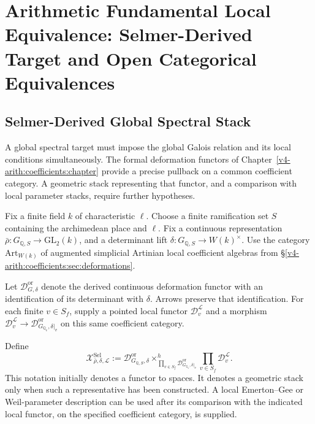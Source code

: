 \chapter{Arithmetic Fundamental Local Equivalence: Selmer-Derived Target and Open Categorical Equivalences}
\label{v4-arith:fle-completion-table}

\section{Selmer-Derived Global Spectral Stack}
\label{v4-arith:fle-table:spectral-target}

A global spectral target must impose the global Galois relation and
its local conditions simultaneously. The formal deformation functors of
Chapter~\ref{v4-arith:coefficients:chapter} provide a precise pullback
on a common coefficient category. A geometric stack representing that
functor, and a comparison with local parameter stacks, require further
hypotheses.

\begin{definition}
\label{v4-arith:fle-table:def:selmer-stack}
Fix a finite field \(k\) of characteristic \(\ell\). Choose a finite
ramification set \(S\) containing the archimedean place and \(\ell\).
Fix a continuous representation
\(\bar\rho:G_{\mathbb Q,S}\to\mathrm{GL}_2(k)\), and a determinant
lift \(\delta:G_{\mathbb Q,S}\to W(k)^\times\).
Use the category \(\mathrm{Art}_{W(k)}\) of augmented simplicial
Artinian local coefficient algebras from
\S\ref{v4-arith:coefficients:sec:deformations}.

Let \(\mathcal D_{G,\delta}^{\mathrm{or}}\) denote the derived
continuous deformation functor with an identification of its determinant
with \(\delta\). Arrows preserve that identification. For each finite
\(v\in S_f\), supply a pointed local functor
\(\mathcal D_v^{\mathcal L}\) and a morphism
\(\mathcal D_v^{\mathcal L}\to\mathcal D_{G_{\mathbb Q_v},\delta|_v}^{\mathrm{or}}\)
on this same coefficient category.

Define
\begin{equation}
\label{v4-arith:fle-table:eq:selmer-stack}
\mathcal X^{\mathrm{Sel}}_{\bar\rho,\delta,\mathcal L}
:=\mathcal D_{G_{\mathbb Q,S},\delta}^{\mathrm{or}}
\times^h_{\prod_{v\in S_f}\mathcal D_{G_{\mathbb Q_v},\delta|_v}^{\mathrm{or}}}
\prod_{v\in S_f}\mathcal D_v^{\mathcal L}.
\end{equation}
This notation initially denotes a functor to spaces. It denotes a
geometric stack only when such a representative has been constructed.
A local Emerton--Gee or Weil-parameter description can be used after
its comparison with the indicated local functor, on the specified
coefficient category, is supplied.
\end{definition}

